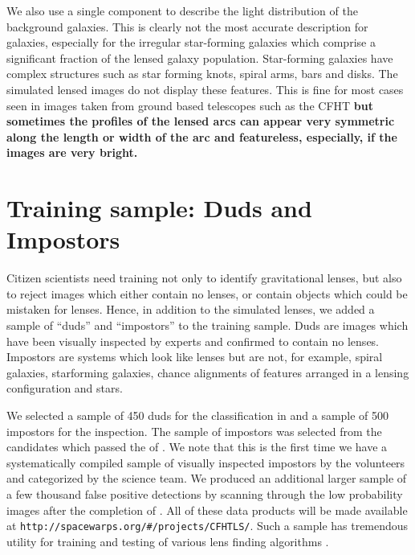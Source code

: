 \documentclass[useAMS,usenatbib,a4paper]{mn2e}
\begin{document}
We also use a single component to describe the light distribution of the
background galaxies. This is clearly not the most accurate description for
galaxies, especially for the irregular star-forming galaxies which comprise
a significant fraction
of the lensed galaxy population. Star-forming galaxies have complex structures
such as star forming knots, spiral arms, bars and disks. The simulated lensed
images do not display these features. This is fine for most cases seen in
images taken from ground based telescopes such as the CFHT
{\bf but sometimes the profiles of the lensed arcs can appear very symmetric along the
length or width of the arc and featureless, especially, if the images
are very bright.}


\section{Training sample: Duds and Impostors}
\label{sec:dfp}

Citizen scientists need training not only to identify gravitational
lenses, but also to reject images which either contain no lenses, or contain
objects which could be mistaken for lenses. Hence, in addition to the simulated
lenses, we added a sample of ``duds'' and ``impostors'' to the training
sample. Duds are images which have been visually inspected by experts
and confirmed to contain no lenses. Impostors are systems
which look like lenses but are not, for example, spiral galaxies,
starforming galaxies, chance alignments of features arranged in a
lensing configuration and stars.

We selected a sample of 450 duds for the \StageOne classification in \sw
and a sample of 500 impostors for the \StageTwo inspection. The
sample of impostors was selected from the candidates which passed
the \StageOne of \sw. We note that this is the first time we have a
systematically compiled sample of visually inspected impostors by
the \sw volunteers and categorized by the science team. We produced an
additional larger sample of a few thousand false positive detections
by scanning through the
low probability images after the completion of \StageTwo. All of these
data products will be made available at
\texttt{http://spacewarps.org/\#/projects/CFHTLS/}. Such a sample has tremendous
utility for training and testing of various lens finding algorithms
\citep[e.g.,][]{Chan2014}.
\end{document}
